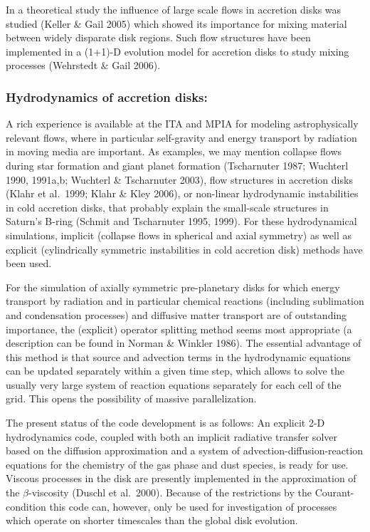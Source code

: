 In a theoretical study the influence of large scale flows in accretion disks
was studied (Keller \& Gail 2005) which showed its importance for mixing
material between widely disparate disk regions. Such flow structures have been
implemented in a (1+1)-D evolution model for accretion disks to study mixing
processes (Wehrstedt \& Gail 2006).

\subsubsection{Hydrodynamics of accretion disks:} A rich experience is
available at the ITA and MPIA for modeling astrophysically
relevant flows, where in particular self-gravity and energy
transport by radiation in moving media are important. As examples,
we may mention collapse flows during star formation and giant
planet formation (Tscharnuter 1987; Wuchterl 1990, 1991a,b;
Wuchterl \& Tscharnuter 2003), flow structures in accretion disks
(Klahr et al.~1999; Klahr \& Kley 2006), or non-linear
hydrodynamic instabilities in cold accretion disks, that probably
explain the small-scale structures in Saturn's B-ring (Schmit and
Tscharnuter 1995, 1999). For these hydrodynamical simulations,
implicit (collapse flows in spherical and axial symmetry) as well
as explicit (cylindrically symmetric instabilities in cold
accretion disk) methods have been used.

For the simulation of axially symmetric pre-planetary disks for which energy
transport by radiation and in particular chemical reactions (including
sublimation and condensation processes) and diffusive matter transport are
of outstanding importance, the (explicit) operator splitting method seems most
appropriate (a description can be found in Norman \& Winkler 1986). The
essential advantage of this method is that source and advection terms in the
hydrodynamic equations can be updated separately within a given time step,
which allows to solve the usually very large system of reaction equations
separately for each cell of the grid. This opens the possibility of massive
parallelization.

The present status of the code development is as follows: An
explicit 2-D hydrodynamics code, coupled with both an implicit
radiative transfer solver based on the diffusion approximation and
a system of advection-diffusion-reaction equations for the
chemistry of the gas phase and dust species, is ready for use.
Viscous processes in the disk are presently implemented in the
approximation of the $\beta$-viscosity (Duschl et al.~2000).
Because of the restrictions by the Courant-condition this code
can, however, only be used for investigation of processes which
operate on shorter timescales than the global disk evolution.
%
%

